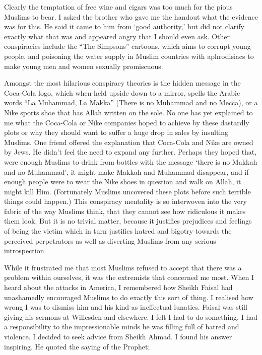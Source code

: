 \documentclass[12pt]{memoir}
\newcommand{\cor}[2]{#2} %
\begin{document}
Clearly the temptation of free wine and cigars
was too much for the pious Muslims to bear.
I asked the brother who gave me the handout what the evidence was for this.
He said it came to him from ‘good authority,’
but did not clarify exactly what that was
and appeared angry that I should even ask.
Other conspiracies include the “The Simpsons” cartoons,
which aims to corrupt young people, and poisoning the water supply
in Muslim countries with aphrodisiacs
to make young men and women sexually promiscuous.

Amongst the most hilarious conspiracy theories
is the hidden message in the Coca-Cola logo,
which when held upside down to a mirror,
spells the Arabic words “La Muhammad, La Makka”
(There is no Muhammad and no Mecca),
or a Nike sports shoe that has Allah written on the sole.
No one has yet explained to me what the Coca-Cola or Nike companies
hoped to achieve by these dastardly plots
or why they should want to suffer a huge drop in sales by insulting Muslims.
One friend offered the explanation that Coca-Cola and Nike are owned by Jews.
He didn’t feel the need to expand any further.
Perhaps they hoped that\cor{}{,} were enough Muslims to drink from bottles
with the message ‘there is no Makkah and no Muhammad’,
it might make Makkah and Muhammad disappear,
and if enough people were to wear the Nike shoes
in question and walk on Allah, it might kill Him.
(Fortunately Muslims uncovered these plots
before such terrible things could happen.)
This conspiracy mentality is so interwoven
into the very fabric of the way Muslims think,
that they cannot see how ridiculous it makes them look.
But it is no trivial matter, because it justifies prejudices and feelings
of being the victim which in turn justifies hatred and bigotry
towards the perceived perpetrators as well as diverting Muslims
from any serious introspection.

While it frustrated me that most Muslims refused to accept
that there was a problem within ourselves,
it was the extremists that concerned me most.
When I heard about the attacks in America,
I remembered how Sheikh Faisal had unashamedly encouraged Muslims
to do exactly this sort of thing.
I realised how wrong I was to dismiss him
and his kind as ineffectual lunatics.
Faisal was still giving his sermons at Willesden and elsewhere.
I felt I had to do something.
I had a responsibility to the impressionable minds
he was filling full of hatred and violence.
I decided to seek advice from Sheikh Ahmad.
I found his answer inspiring.
He quoted the saying of the Prophet;
\end{document}
